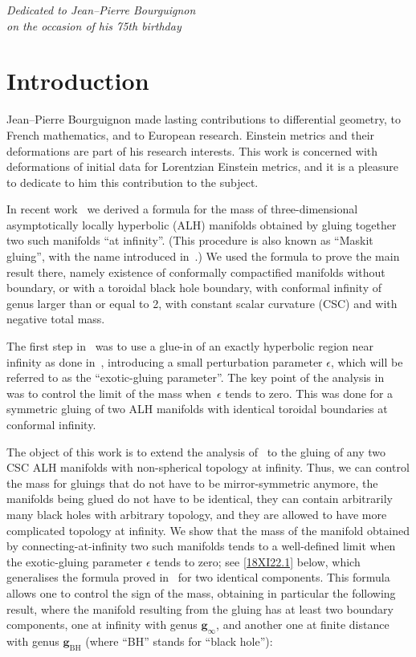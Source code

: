 \documentclass[pdftex]{sigma}
\numberwithin{equation}{section}
\begin{document}
\begin{flushright}
\begin{minipage}{65mm}
\it Dedicated to Jean--Pierre Bourguignon\\ on the occasion of his 75th birthday
\end{minipage}
\end{flushright}

\renewcommand{\thefootnote}{\arabic{footnote}}
\setcounter{footnote}{0}

\section{Introduction}
Jean--Pierre Bourguignon made lasting contributions to differential geometry, to French mathematics, and to European research. Einstein metrics and their deformations are part of his research interests. This work is concerned with deformations of initial data for Lorentzian Einstein metrics, and it is a pleasure to dedicate to him this contribution to the subject.

In recent work~\cite{CDW} we derived a formula for the mass of three-dimensional asymptotically locally hyperbolic (ALH) manifolds obtained by gluing together two such manifolds ``at infinity''.
(This procedure is also known as ``Maskit gluing'', with the name introduced in~\cite{MazzeoPacardMaskit}.) We used the formula to prove {the main result there, namely} existence of conformally compactified manifolds without boundary, or with a toroidal black hole boundary, with conformal infinity of genus larger than {or} equal to 2, with constant scalar curvature (CSC) and with negative total mass.

The first step in~\cite{CDW} was to use a glue-in of an exactly hyperbolic region near infinity
as done in~\cite{ChDelayExotic}, introducing a small perturbation parameter $\epsilon$, which will be referred to as the ``exotic-gluing parameter''. The key point of the analysis in~\cite{CDW} was to control the limit of the mass when~$\epsilon$ tends to zero. This was done for a symmetric gluing of
two ALH manifolds with identical toroidal boundaries at conformal infinity.

The object of this work is to extend the analysis of~\cite{CDW} to the gluing of any two CSC
ALH manifolds
with non-spherical topology at infinity. {Thus, we can control the mass for gluings that do not have to be mirror-symmetric anymore, the manifolds being glued do not have to be identical, they can contain arbitrarily many black holes with arbitrary topology, and they are allowed to have more complicated topology at infinity.}
We show that the mass of the manifold obtained by connecting-at-infinity two such manifolds tends to a well-defined limit when the exotic-gluing parameter $\epsilon$ tends to zero; {see \eqref{18XI22.1} below, which generalises the formula proved in~\cite{CDW} for two identical components.
This} formula allows one to control the sign of the mass, obtaining in particular the following result, where the manifold resulting from the gluing has at least two boundary components, one at infinity with genus $ {{\mathbf g}_\infty}$, and another one at finite distance with genus ${{\mathbf g}_{\mathrm{BH}}}$ (where ``BH'' stands for ``black hole''):
\end{document}
